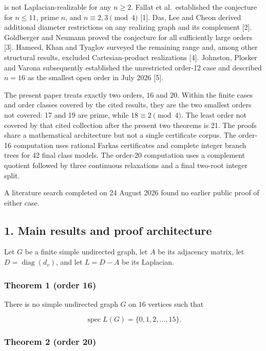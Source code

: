 \documentclass[
  english,
  11pt,
  a4paper,
]{article}
\begin{document}
is not Laplacian-realizable for any \(n\ge2\). Fallat et al.~established
the conjecture for \(n\le11\), prime \(n\), and \(n\equiv2,3\pmod4\)
{[}1{]}. Das, Lee and Cheon derived additional diameter restrictions on
any realizing graph and its complement {[}2{]}. Goldberger and Neumann
proved the conjecture for all sufficiently large orders {[}3{]}. Hameed,
Khan and Tyaglov surveyed the remaining range and, among other
structural results, excluded Cartesian-product realizations {[}4{]}.
Johnston, Plosker and Varona subsequently established the unrestricted
order-12 case and described \(n=16\) as the smallest open order in July
2026 {[}5{]}.

The present paper treats exactly two orders, \(16\) and \(20\). Within
the finite cases and order classes covered by the cited results, they
are the two smallest orders not covered: 17 and 19 are prime, while
\(18\equiv2\pmod4\). The least order not covered by that cited
collection after the present two theorems is 21. The proofs share a
mathematical architecture but not a single certificate corpus. The
order-16 computation uses rational Farkas certificates and complete
integer branch trees for 42 final class models. The order-20 computation
uses a complement quotient followed by three continuous relaxations and
a final two-root integer split.

A literature search completed on 24 August 2026 found no earlier public
proof of either case.

\subsection{1. Main results and proof
architecture}\label{main-results-and-proof-architecture}

Let \(G\) be a finite simple undirected graph, let \(A\) be its
adjacency matrix, let \(D=\operatorname{diag}(d_v)\), and let \(L=D-A\)
be its Laplacian.

\subsubsection{Theorem 1 (order 16)}\label{theorem-1-order-16}

There is no simple undirected graph \(G\) on \(16\) vertices such that

\[
\operatorname{spec}L(G)=\{0,1,2,\ldots,15\}.
\]

\subsubsection{Theorem 2 (order 20)}\label{theorem-2-order-20}
\end{document}
